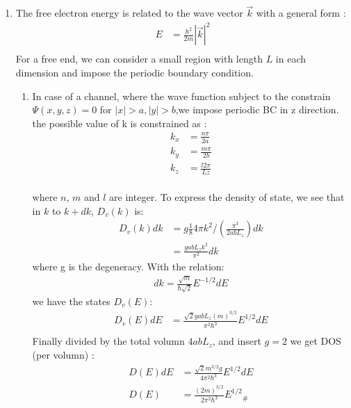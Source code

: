 \documentclass[notitlepage]{revtex4-1}
\begin{document}
\begin{CJK}{UTF8}{bsmi}
\begin{enumerate}
	\item The free electron energy is related to the wave vector $\vec{k}$ with a general form :
	\begin{align*}
		E &= \frac{\hbar^2}{2m} |\vec{k}|^2 \\
	\end{align*} 
	For a free end, we can consider a small region with length $L$ in each dimension and impose the periodic boundary condition. 
	\begin{enumerate}[label=(\alph*)]
		\item In case of a channel, where the wave function subject to the constrain $\Psi(x,y,z)=0$ for $|x|>a,|y|>b$,we impose periodic BC in z direction. the possible value of k is constrained as :
		\begin{align*}
			k_x &= \frac{n\pi}{2a} \\
			k_y &= \frac{m\pi}{2b} \\ 
			k_z &= \frac{l2\pi}{Lz} \\
		\end{align*} 
		
		where $n$, $m$ and $l$ are integer. To express the density of state, we see that in $k$ to $k+dk$, $D_v(k)$ is:
		\begin{align*}
			D_v(k)dk &= g\frac{1}{8} 4\pi k^2 / (\frac{\pi^3}{2abL_z}) dk \\
				   &= \frac{gabL_z k^2}{\pi^2} dk 
		\end{align*} 
		where g is the degeneracy. With the relation:
		\begin{align*}
			dk = \frac{\sqrt{m}}{\hbar\sqrt{2}}E^{-1/2} dE  
		\end{align*} 			
		we have the states $D_v(E)$:
		\begin{align*}
			D_v(E)dE &= \frac{\sqrt{2} gabL_z (m)^{3/2}}{\pi^2\hbar^3} E^{1/2} dE \\  
		\end{align*} 		
		Finally divided by the total volumn $4abL_z$, and insert $g=2$ we get DOS (per volumn) :
		\begin{align*}
			D(E)dE  &= \frac{\sqrt{2}m^{3/2}g}{4\pi^2 \hbar^3} E^{1/2} dE \\
			D(E)    &= \frac{(2m)^{3/2}}{2\pi^2 \hbar^3} {E^{1/2}}_{\#}
		\end{align*} 		
				

\end{enumerate}
\end{enumerate}
\end{CJK}
\end{document}
